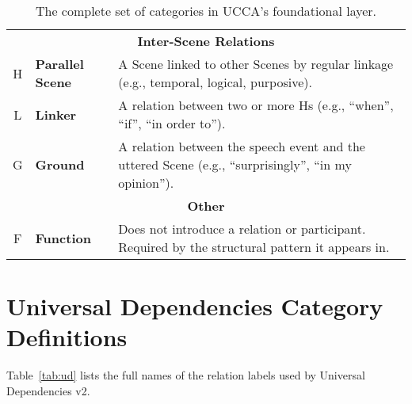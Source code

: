 \begin{table}[H]
\begin{tabular}{cp{2cm}p{12.5cm}}
\multicolumn{3}{c}{\bf Inter-Scene Relations}\\
H & {\bf Parallel Scene} & A Scene linked to other Scenes by regular linkage (e.g., temporal, logical, purposive).\\
L & {\bf Linker} & A relation between two or more Hs (e.g., ``when'', ``if'', ``in order to'').\\
G & {\bf Ground} & A relation between the speech event and the uttered Scene (e.g., ``surprisingly'', ``in my opinion'').\\
\multicolumn{3}{c}{\bf Other}\\
F & {\bf Function} & Does not introduce a relation or participant. Required by the structural pattern it appears in.
\end{tabular}
\caption{The complete set of categories in UCCA's foundational layer.\label{tab:ucca}}
\end{table}

\section{Universal Dependencies Category Definitions}

Table~\ref{tab:ud} lists the full names of the
relation labels used by Universal Dependencies v2.

